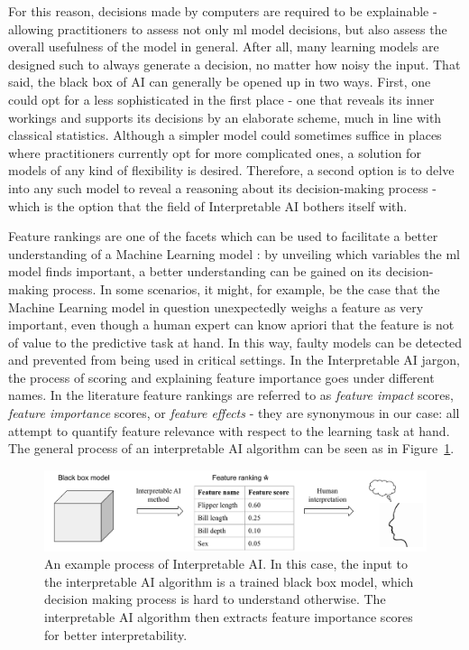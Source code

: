 \documentclass[../main.tex]{subfiles}
\begin{document}
For this reason, decisions made by computers are required to be explainable - allowing practitioners to assess not only \gls{ml} model decisions, but also assess the overall usefulness of the model in general. After all, many learning models are designed such to always generate a decision, no matter how noisy the input. That said, the black box of AI can generally be opened up in two ways. First, one could opt for a less sophisticated in the first place - one that reveals its inner workings and supports its decisions by an elaborate scheme, much in line with classical statistics. Although a simpler model could sometimes suffice in places where practitioners currently opt for more complicated ones, a solution for models of any kind of flexibility is desired. Therefore, a second option is to delve into any such model to reveal a reasoning about its decision-making process - which is the option that the field of Interpretable AI bothers itself with.

Feature rankings are one of the facets which can be used to facilitate a better understanding of a Machine Learning model \citep{hansen_interpretability_2019}: by unveiling which variables the \gls{ml} model finds important, a better understanding can be gained on its decision-making process. In some scenarios, it might, for example, be the case that the Machine Learning model in question unexpectedly weighs a feature as very important, even though a human expert can know apriori that the feature is not of value to the predictive task at hand. In this way, faulty models can be detected and prevented from being used in critical settings. In the Interpretable AI jargon, the process of scoring and explaining feature importance goes under different names. In the literature feature rankings are referred to as \textit{feature impact} scores, \textit{feature importance} scores, or \textit{feature effects} - they are synonymous in our case: all attempt to quantify feature relevance with respect to the learning task at hand. The general process of an interpretable AI algorithm can be seen as in Figure~\ref{fig:schematic-interpretable-ai}.

\begin{figure}[ht]
    \centering
    \includegraphics[width=\linewidth]{report/images/schematic-interpretable-ai.pdf}
    \caption{An example process of Interpretable AI. In this case, the input to the interpretable AI algorithm is a trained black box model, which decision making process is hard to understand otherwise. The interpretable AI algorithm then extracts feature importance scores for better interpretability.}
    \label{fig:schematic-interpretable-ai}
\end{figure}
\end{document}

